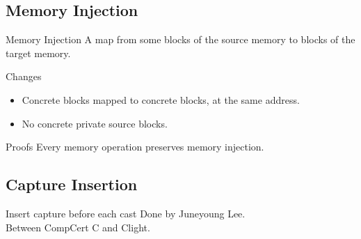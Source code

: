 \subsection{Memory Injection}
\begin{frame}{\subsecname}

  \begin{block}{Memory Injection}
    A map from some blocks of the source memory to blocks of the target memory.
  \end{block}
  \vfill
  \begin{block}{Changes}
    \begin{itemize}
    \item Concrete blocks mapped to concrete blocks, at the same address.
    \item No concrete private source blocks.
    \end{itemize}
  \end{block}
  \vfill
  \begin{exampleblock}{Proofs}
    Every memory operation preserves memory injection.
  \end{exampleblock}
  
\end{frame}

\subsection{Capture Insertion}
\begin{frame}{\subsecname}

  \begin{block}{Insert capture before each cast}
  Done by Juneyoung Lee.\\
  Between CompCert C and Clight.
  \end{block}
  \vfill
  \begin{minipage}{0.48\textwidth}
    \begin{center}
      
    \end{center}
  \end{minipage}
  \begin{minipage}{0.48\textwidth}
    
  \end{minipage}


\end{frame}

